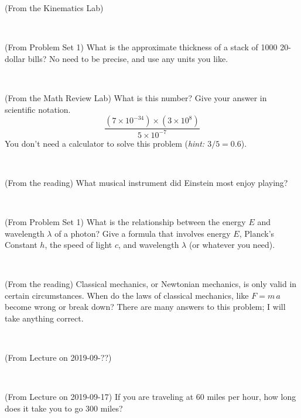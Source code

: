 \documentclass[12pt, letterpaper]{article}
\begin{document}
\begin{problem} (From the Kinematics Lab)

\end{problem}


\vfill ~

\begin{problem} (From Problem Set 1)
What is the approximate thickness of a stack of 1000 20-dollar bills?
No need to be precise, and use any units you like.
\end{problem}


\vfill ~

\begin{problem} (From the Math Review Lab)
What is this number? Give your answer in scientific notation.
$$
\frac{(7\times10^{-34})\times(3\times10^8)}{5\times10^{-7}}
$$
You don't need a calculator to solve this problem (\textit{hint: $3/5=0.6$}).
\end{problem}


\vfill ~

\begin{problem} (From the reading)
What musical instrument did Einstein most enjoy playing?
\end{problem}


\vfill ~


\clearpage


\begin{problem} (From Problem Set 1)
What is the relationship between the energy $E$ and wavelength
$\lambda$ of a photon? Give a formula that involves energy $E$,
Planck's Constant $h$, the speed of light $c$, and wavelength
$\lambda$ (or whatever you need).
\end{problem}

\vfill ~

\begin{problem} (From the reading)
Classical mechanics, or Newtonian mechanics, is only valid in certain
circumstances. When do the laws of classical mechanics, like $F =
m\,a$ become wrong or break down? There are many answers to this
problem; I will take anything correct.
\end{problem}


\vfill ~

\begin{problem} (From Lecture on 2019-09-??)
\end{problem}


\vfill ~

\begin{problem} (From Lecture on 2019-09-17)
If you are traveling at 60 miles per hour, how long does
it take you to go 300 miles?
\end{problem}
\end{document}
